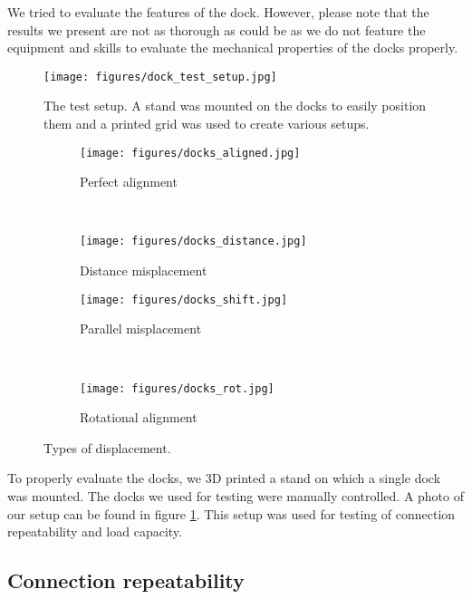 We tried to evaluate the features of the dock. However, please note that the
results we present are not as thorough as could be as we do not feature the
equipment and skills to evaluate the mechanical properties of the docks
properly.

\begin{figure}[!t]
    \centering
    \texttt{[image: figures/dock\_test\_setup.jpg]}
    \caption{The test setup. A stand was mounted on the docks to easily position
    them and a printed grid was used to create various setups.}
    \label{fig:dock_test_setup}
\end{figure}

\begin{figure}[!t]
    \centering
    \begin{subfigure}[b]{0.45\textwidth}
        \texttt{[image: figures/docks\_aligned.jpg]}
        \caption{Perfect alignment}
        \label{fig:dock_test_aligned}
    \end{subfigure}
    ~
    \begin{subfigure}[b]{0.45\textwidth}
        \texttt{[image: figures/docks\_distance.jpg]}
        \caption{Distance misplacement}
        \label{fig:dock_test_distance}
    \end{subfigure}

    \begin{subfigure}[b]{0.45\textwidth}
        \texttt{[image: figures/docks\_shift.jpg]}
        \caption{Parallel misplacement}
        \label{fig:dock_test_parallel}
    \end{subfigure}
    ~
    \begin{subfigure}[b]{0.45\textwidth}
        \texttt{[image: figures/docks\_rot.jpg]}
        \caption{Rotational alignment}
        \label{fig:dock_test_rot}
    \end{subfigure}

    \caption{Types of displacement.}
    \label{fig:dock_diplacement}
\end{figure}

To properly evaluate the docks, we 3D printed a stand on which a single dock was
mounted. The docks we used for testing were manually controlled. A photo of our
setup can be found in figure \ref{fig:dock_test_setup}. This setup was used for
testing of connection repeatability and load capacity.

\subsection{Connection repeatability}

